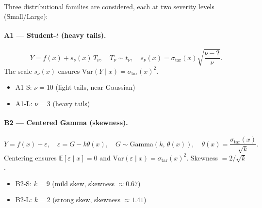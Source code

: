 \documentclass[11pt]{article}
\begin{document}
Three distributional families are considered, each at two severity levels (Small/Large):

\paragraph{A1 --- Student-$t$ (heavy tails).}
\[
  Y = f(x) + s_\nu(x)\, T_\nu, \quad T_\nu \sim t_\nu,
  \quad s_\nu(x) = \sigma_{\mathrm{tar}}(x)\sqrt{\frac{\nu-2}{\nu}}.
\]
The scale $s_\nu(x)$ ensures $\mathrm{Var}(Y \mid x) = \sigma_{\mathrm{tar}}(x)^2$.
\begin{itemize}
  \item A1-S: $\nu = 10$ (light tails, near-Gaussian)
  \item A1-L: $\nu = 3$ (heavy tails)
\end{itemize}

\paragraph{B2 --- Centered Gamma (skewness).}
\[
  Y = f(x) + \varepsilon, \quad \varepsilon = G - k\theta(x),
  \quad G \sim \mathrm{Gamma}(k,\, \theta(x)),
  \quad \theta(x) = \frac{\sigma_{\mathrm{tar}}(x)}{\sqrt{k}}.
\]
Centering ensures $\mathbb{E}[\varepsilon \mid x] = 0$ and $\mathrm{Var}(\varepsilon \mid x) = \sigma_{\mathrm{tar}}(x)^2$.
Skewness $= 2/\sqrt{k}$.
\begin{itemize}
  \item B2-S: $k = 9$ (mild skew, skewness $\approx 0.67$)
  \item B2-L: $k = 2$ (strong skew, skewness $\approx 1.41$)
\end{itemize}
\end{document}
